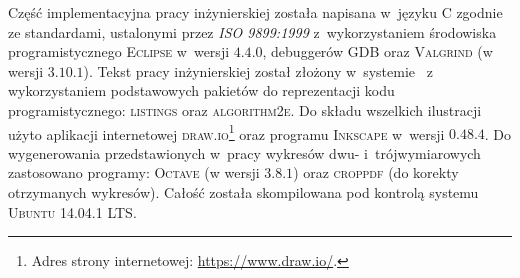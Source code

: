 Część implementacyjna pracy inżynierskiej została napisana w~języku \textsf{C} zgodnie ze standardami, ustalonymi przez \textit{\textsc{ISO 9899:1999}} z~wykorzystaniem środowiska programistycznego \textsc{Eclipse} w~wersji \textsc{$4.4.0$}, debuggerów \textsc{GDB} oraz \textsc{Valgrind} (w wersji \textsc{$3.10.1$}).
Tekst pracy inżynierskiej został złożony w~systemie \LaTeXe~z wykorzystaniem podstawowych pakietów do reprezentacji kodu programistycznego: \textsc{listings} oraz \textsc{algorithm2e}.
Do składu wszelkich ilustracji użyto aplikacji internetowej \textsc{draw.io}\footnote{
	Adres strony internetowej: \url{https://www.draw.io/}.
} oraz programu \textsc{Inkscape} w~wersji \textsc{$0.48.4$}.
Do wygenerowania przedstawionych w~pracy wykresów dwu- i~trójwymiarowych zastosowano programy: \textsc{Octave} (w wersji \textsc{$3.8.1$}) oraz \textsc{croppdf} (do korekty otrzymanych wykresów).
Całość została skompilowana pod kontrolą systemu \textsc{Ubuntu 14.04.1 LTS}.